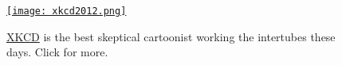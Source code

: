 \captionsetup[figure]{labelformat=empty}
\begin{figure}[htbp]
\centering
\href{https://xkcd.com/}{\texttt{[image: xkcd2012.png]}}
\caption[\href{https://xkcd.com/}{XKCD} is the best skeptical cartoonist working the intertubes]{\href{https://xkcd.com/}{XKCD} is the best skeptical cartoonist working the intertubes these days. Click for more.}
\label{fig:3575X0}
\end{figure}





%